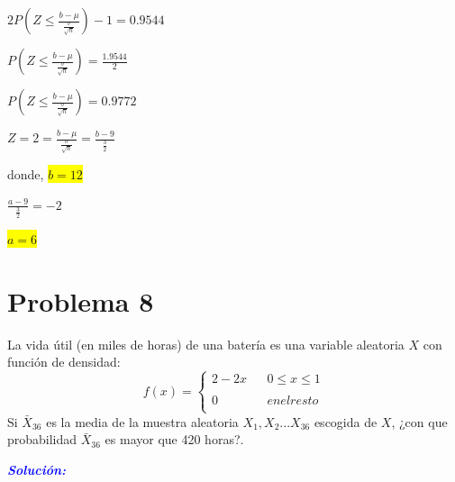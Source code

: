 \documentclass[a4paper,openright,12pt]{book}
\begin{document}
{\begin{center}
\end{center}
\begin{center}
$2P(Z \leq \frac{b - \mu}{\frac{\sigma}{\sqrt{n}}})-1=0.9544$\\
\end{center}
\begin{center}
$P(Z \leq \frac{b - \mu}{\frac{\sigma}{\sqrt{n}}})=\frac{1.9544}{2}$\\
\end{center}
\begin{center}
$P(Z \leq \frac{b - \mu}{\frac{\sigma}{\sqrt{n}}})=0.9772$\\
\end{center}
\begin{center}
$Z=2=\frac{b-\mu}{\frac{\sigma}{\sqrt{n}}}=\frac{b-9}{\frac{3}{2}}$\\
\end{center}
\begin{center}
donde, \colorbox{yellow}{$b = 12$}\\
\end{center}
\begin{center}
$\frac{a-9}{\frac{3}{2}}=-2$\\
\end{center}
\begin{center}
\colorbox{yellow}{$a = 6$}
\end{center}


\section{Problema 8}
La vida útil (en miles de horas) de una batería es una variable aleatoria $X$ con función de densidad:
\begin{equation*}
f(x)= \left\{ \begin{array}{lcc}
			 2-2x &    &0\leq x \leq 1 \\
			 \\0 &       &en el resto \\
			 \end{array}
	\right.
\end{equation*}
Si $\bar{X}_{36}$ es la media de la muestra aleatoria $X_{1},X_{2}...X_{36}$  escogida de $X$, ¿con que probabilidad $\bar{X}_{36}$ es mayor que 420 horas?.

\begin{center}
	\textbf{\textit{\textcolor{blue}{Solución:}}}\\
\end{center}

}
\end{document}
